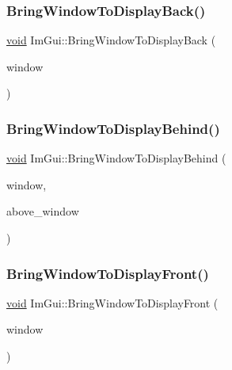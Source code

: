 \mbox{\label{namespaceImGui_a34d2363f631f1df5ab1a2a131ab98fa7}} 
\subsubsection{\texorpdfstring{Bring\+Window\+To\+Display\+Back()}{BringWindowToDisplayBack()}}
{\footnotesize\ttfamily \hyperlink{imgui__impl__opengl3__loader_8h_ac668e7cffd9e2e9cfee428b9b2f34fa7}{void} Im\+Gui\+::\+Bring\+Window\+To\+Display\+Back (\begin{DoxyParamCaption}\item[{\hyperlink{structImGuiWindow}{Im\+Gui\+Window} $\ast$}]{window }\end{DoxyParamCaption})}

\mbox{\label{namespaceImGui_a8cae2f7a08f820a8d5349d1964603b20}} 
\subsubsection{\texorpdfstring{Bring\+Window\+To\+Display\+Behind()}{BringWindowToDisplayBehind()}}
{\footnotesize\ttfamily \hyperlink{imgui__impl__opengl3__loader_8h_ac668e7cffd9e2e9cfee428b9b2f34fa7}{void} Im\+Gui\+::\+Bring\+Window\+To\+Display\+Behind (\begin{DoxyParamCaption}\item[{\hyperlink{structImGuiWindow}{Im\+Gui\+Window} $\ast$}]{window,  }\item[{\hyperlink{structImGuiWindow}{Im\+Gui\+Window} $\ast$}]{above\+\_\+window }\end{DoxyParamCaption})}

\mbox{\label{namespaceImGui_a1f7b95f36d03751c928af7b1b745e959}} 
\subsubsection{\texorpdfstring{Bring\+Window\+To\+Display\+Front()}{BringWindowToDisplayFront()}}
{\footnotesize\ttfamily \hyperlink{imgui__impl__opengl3__loader_8h_ac668e7cffd9e2e9cfee428b9b2f34fa7}{void} Im\+Gui\+::\+Bring\+Window\+To\+Display\+Front (\begin{DoxyParamCaption}\item[{\hyperlink{structImGuiWindow}{Im\+Gui\+Window} $\ast$}]{window }\end{DoxyParamCaption})}

